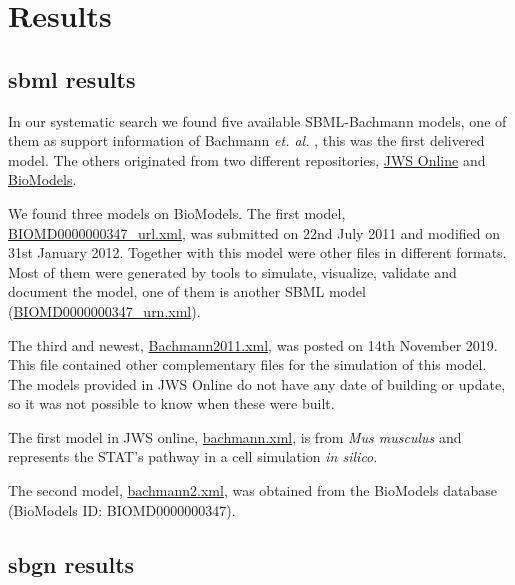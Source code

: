 \section*{Results} \label{sec:resuslt}
\subsection*{\acl{sbml} results}
In our systematic search we found five available SBML-Bachmann models, one of them as support information of Bachmann \textit{et. al.} \cite{bachmannmodel}, this was the first delivered model. The others originated  from two different repositories, \hyperlink{https://www.systemsmedicine.net/posts/jws-online-biological-systems-modelling}{JWS Online} and \hyperlink{https://www.ebi.ac.uk/biomodels/}{BioModels}.

We found three models on BioModels. The first model, \hyperlink{https://www.ebi.ac.uk/biomodels/model/download/BIOMD0000000347.2?filename=BIOMD0000000347_url.xml}{\textsf{BIOMD0000000347\_url.xml}}, was submitted on 22nd July 2011 and modified on 31st January 2012. Together with this model were other files in different formats. Most of them were generated by tools to simulate, visualize, validate and document the model, one of them is another SBML model (\hyperlink{https://www.ebi.ac.uk/biomodels/model/download/BIOMD0000000347.2?filename=BIOMD0000000347_url.xml}{\textsf{BIOMD0000000347\_urn.xml}}). 

The third and newest, \hyperlink{https://www.ebi.ac.uk/biomodels/model/download/BIOMD0000000861.2?filename=Bachmann2011.xml}{\textsf{Bachmann2011.xml}}, was posted on 14th November 2019. This file contained other complementary files for the simulation of this model. The models provided in JWS Online do not have any date of building or update, so it was not possible to know when these were built. 

The first model in JWS online, \hyperlink{https://jjj.bio.vu.nl/models/bachmann/sbml/?download=1}{\textsf{bachmann.xml}}, is from \textit{Mus musculus} and represents the STAT's pathway in a cell simulation \textit{in silico}. 

The second model, \hyperlink{https://jjj.bio.vu.nl/models/bachmann2/sbml/?download=1}{\textsf{bachmann2.xml}}, was obtained from the BioModels database (BioModels ID: BIOMD0000000347).

\subsection*{\acl{sbgn} results}

